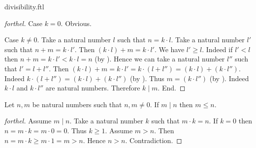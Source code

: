 \documentclass{naproche-library}
\begin{document}
\begin{smodule}{divisibility.ftl}
\begin{proof}[forthel]
    Case $k = 0$. Obvious.

    Case $k \neq 0$.
      Take a natural number $l$ such that $n = k \cdot l$.
      Take a natural number $l'$ such that $n + m = k \cdot l'$.
      Then $(k \cdot l) + m = k \cdot l'$.
      We have $l' \geq l$.
      Indeed if $l' < l$ then
      $n + m
        = k \cdot l'
        < k \cdot l
        = n$ (by ).
      Hence we can take a natural number $l''$ such that $l' = l + l''$.
      Then $(k \cdot l) + m
        = k \cdot l'
        = k \cdot (l + l'')
        = (k \cdot l) + (k \cdot l'')$.
      Indeed $k \cdot (l + l'') = (k \cdot l) + (k \cdot l'')$ (by ).
      Thus $m = (k \cdot l'')$ (by ).
      Indeed $k \cdot l$ and $k \cdot l''$ are natural numbers.
      Therefore $k \mid m$.
    End.
  \end{proof}

  \begin{proposition}[forthel,id=ARITHMETIC_07_2187144577679360,printid]
    Let $n, m$ be natural numbers such that $n, m \neq 0$.
    If $m \mid n$ then $m \leq n$.
  \end{proposition}
  \begin{proof}[forthel]
    Assume $m \mid n$.
    Take a natural number $k$ such that $m \cdot k = n$.
    If $k = 0$ then
    $n
      = m \cdot k
      = m \cdot 0
      = 0$.
    Thus $k \geq 1$.
    Assume $m > n$.
    Then $n
      = m \cdot k
      \geq m \cdot 1
      = m
      > n$.
    Hence $n > n$.
    Contradiction.
  \end{proof}
\end{smodule}
\end{document}
